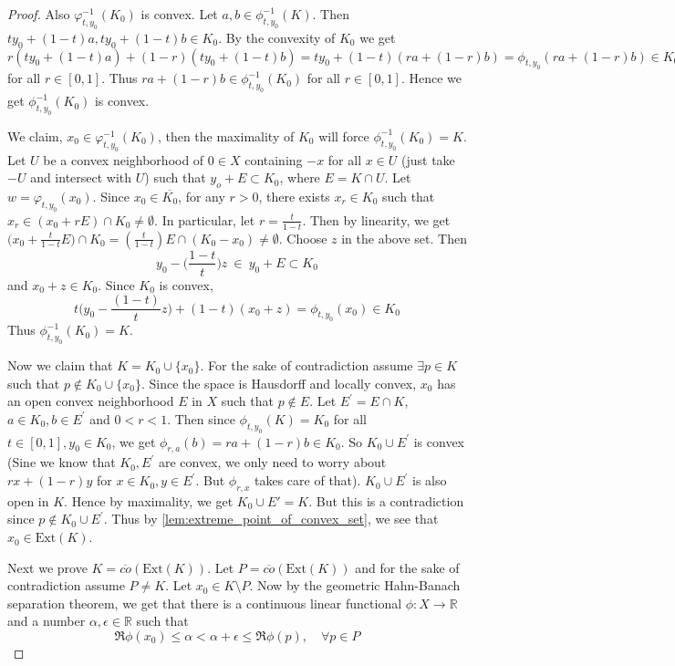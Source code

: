 \begin{proof}
  Also $\varphi_{t, y_0}^{-1}(K_0)$ is convex. Let $a, b \in
  \phi^{-1}_{t, y_0}(K)$. Then $ty_0 + (1-t)a, ty_0 + (1-t)b \in
  K_0$. By the convexity of $K_0$ we get $r(ty_0 + (1-t)a) +
  (1-r)(ty_0 + (1-t)b) = ty_0 + (1-t)(ra + (1-r)b) = \phi_{t, y_0}(ra
  + (1-r)b) \in K_0$ for all $r \in [0, 1]$. Thus $ra + (1-r)b \in
  \phi^{-1}_{t, y_0}(K_0)$ for all $r \in [0, 1]$. Hence we get
  $\phi^{-1}_{t, y_0}(K_0)$ is convex.

  We claim, $x_0 \in \varphi_{t, y_0}^{-1}(K_0)$, then the maximality
  of $K_0$ will force $\phi^{-1}_{t, y_0}(K_0) = K$.  Let $U$ be a
  convex neighborhood of $0 \in X$ containing $-x$ for all $x \in U$
  \marginnote{\scriptsize \textcolor{red}{I can't picturize the choice of $z$}}
  (just take $-U$ and intersect with $U$) such that $y_o + E
  \subset K_0$, where $E = K \cap U$. Let $w = \varphi_{t,
  y_0}(x_0)$. Since $x_0 \in
  \overline{K_0}$, for any $r>0$, there exists $x_r \in K_0$ such
  that $x_r \in (x_0 +
  rE) \cap K_0 \neq \emptyset$. In particular, let $r =
  \frac{t}{1-t}$. Then by linearity, we get $\big(x_0 +
  \frac{t}{1-t}E\big) \cap K_0 = ( \frac{t}{1-t}  )E\cap
  (K_0 - x_0) \neq \emptyset$. Choose $z$ in the above set. Then \[
    y_0 - \Big( \frac{1-t}{t} \Big)z \ \in \ y_0 + E \subset K_0
  \]
  and $x_0 + z \in K_0$. Since $K_0$ is convex, \[
    t\Big(y_0 - \frac{(1-t)}{t}z\Big) + (1-t)(x_0 + z)  = \phi_{t,
    y_0}(x_0) \in K_0
  \]
  Thus $\phi^{-1}_{t, y_0}(K_0) = K$.

  Now we claim that $K = K_0 \cup \{ x_0 \}$. For the sake of
  contradiction assume $\exists p \in K$ such that $p \notin K_0 \cup
  \{ x_0 \}$. Since the space is Hausdorff and locally convex, $x_0$ has an
  open convex neighborhood $E$ in $X$ such that $p \not\in E$. Let
  $E^\prime = E \cap K$, $a \in K_0, b \in E^\prime$ and $0 < r < 1$.
  Then since $\phi_{t, y_0}(K) = K_0$ for all $t \in [0, 1], y_0 \in K_0$, we
  get $\phi_{r, a}(b) = ra + (1-r)b \in K_0$. So $K_0 \cup
  E^\prime$ is convex (Sine we know that $K_0, E^\prime$ are convex,
    we only need to worry about $rx + (1-r)y$ for $x \in K_0, y \in
  E^\prime$. But $\phi_{r, x}$ takes care of that). $K_0 \cup
  E^\prime$ is also open in $K$. Hence by maximality, we get $K_0
  \cup E' = K$. But this is a contradiction since $ p \not\in K_0
  \cup E^\prime$. Thus by \autoref{lem:extreme_point_of_convex_set}, we see
  that $x_0 \in \textrm{Ext}(K)$.

  Next we prove $K = \overline{co}(\textrm{Ext}(K))$. Let $P =
  \overline{co}(\textrm{Ext}(K))$ and for the sake of contradiction
  assume $P \neq K$. Let $ x_0 \in K \setminus P$.
  Now by the geometric Hahn-Banach separation theorem, we get that
  there is a continuous linear functional
  $\phi: X \to \mathbb{R}$ and a number $\alpha, \epsilon \in
  \mathbb{R}$ such that \[
    \Re\phi(x_0) \le  \alpha < \alpha + \epsilon \le \Re\phi(p),
    \quad  \forall p \in P
  \]


\end{proof}
